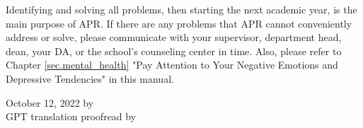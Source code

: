 \vspace{5mm}
Identifying and solving all problems, then starting the next academic year, is the main purpose of APR. If there are any problems that APR cannot conveniently address or solve, please communicate with your supervisor, department head, dean, your DA, or the school's counseling center in time. Also, please refer to Chapter \ref{sec.mental_health} "Pay Attention to Your Negative Emotions and Depressive Tendencies" in this manual.

\begin{flushright}
    October 12, 2022 by \Wu \\
    GPT translation proofread by \Shiyao
\end{flushright}